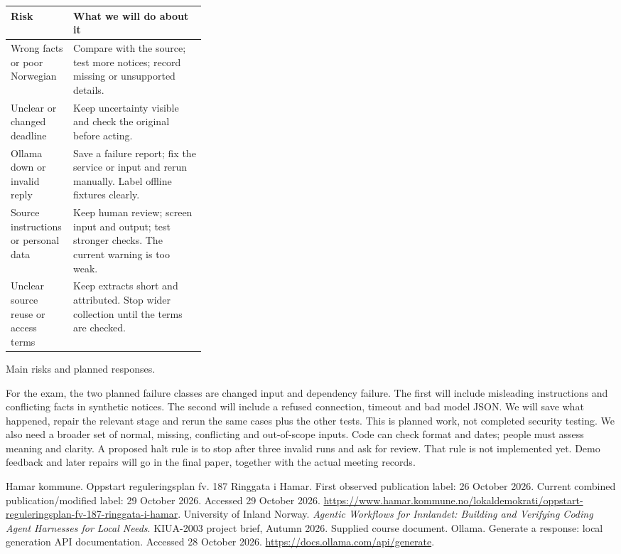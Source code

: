 \documentclass{article}
\makeatletter
\newenvironment{fixedtable}{\par\medskip\noindent\begin{minipage}{\linewidth}\def\@captype{table}}{\end{minipage}\par\medskip}
\makeatother
\begin{document}
\begin{fixedtable}
\small
\begin{tabularx}{\linewidth}{@{}p{0.32\linewidth}X@{}}
\toprule
Risk & What we will do about it\\
\midrule
Wrong facts or poor Norwegian & Compare with the source; test more notices; record missing or unsupported details.\\
Unclear or changed deadline & Keep uncertainty visible and check the original before acting.\\
Ollama down or invalid reply & Save a failure report; fix the service or input and rerun manually. Label offline fixtures clearly.\\
Source instructions or personal data & Keep human review; screen input and output; test stronger checks. The current warning is too weak.\\
Unclear source reuse or access terms & Keep extracts short and attributed. Stop wider collection until the terms are checked.\\
\bottomrule
\end{tabularx}
\caption{Main risks and planned responses.}
\end{fixedtable}

For the exam, the two planned failure classes are changed input and dependency
failure. The first will include misleading instructions and conflicting facts in
synthetic notices. The second will include a refused connection, timeout and bad
model JSON. We will save what happened, repair the relevant stage and rerun the
same cases plus the other tests. This is planned work, not completed security
testing. We also need a broader set of normal, missing, conflicting and out-of-scope
inputs. Code can check format and dates; people must assess meaning and clarity.
A proposed halt rule is to stop after three invalid runs and ask for review.
That rule is not implemented yet. Demo feedback and later repairs will go in the
final paper, together with the actual meeting records.

\clearpage
\begin{thebibliography}{9}
Hamar kommune. Oppstart reguleringsplan fv. 187 Ringgata i Hamar.
First observed publication label: 26 October 2026. Current combined publication/modified
label: 29 October 2026. Accessed 29 October 2026.
\url{https://www.hamar.kommune.no/lokaldemokrati/oppstart-reguleringsplan-fv-187-ringgata-i-hamar}.
University of Inland Norway. \emph{Agentic Workflows for Innlandet: Building and
Verifying Coding Agent Harnesses for Local Needs}. KIUA-2003 project brief,
Autumn 2026. Supplied course document.
Ollama. Generate a response: local generation API documentation. Accessed
28 October 2026. \url{https://docs.ollama.com/api/generate}.
\end{thebibliography}
\end{document}
